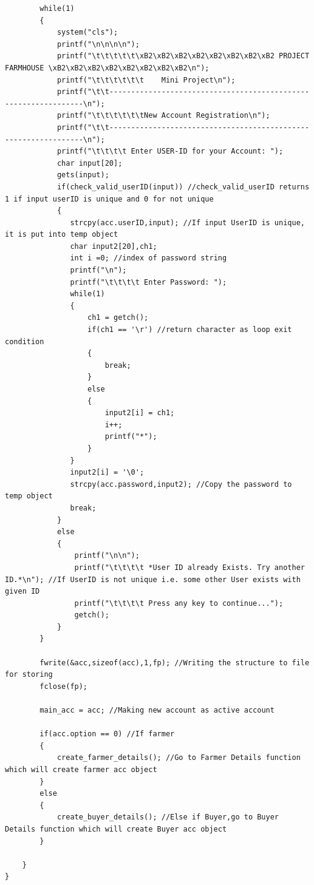 \documentclass[12pt]{article}
\begin{document}
\begin{lstlisting}
        while(1)
        {
            system("cls");
            printf("\n\n\n\n");
            printf("\t\t\t\t\t\xB2\xB2\xB2\xB2\xB2\xB2\xB2\xB2 PROJECT FARMHOUSE \xB2\xB2\xB2\xB2\xB2\xB2\xB2\xB2\n");
            printf("\t\t\t\t\t\t    Mini Project\n");
            printf("\t\t----------------------------------------------------------------\n");
            printf("\t\t\t\t\t\tNew Account Registration\n");
            printf("\t\t----------------------------------------------------------------\n");
            printf("\t\t\t\t Enter USER-ID for your Account: ");
            char input[20];
            gets(input);
            if(check_valid_userID(input)) //check_valid_userID returns 1 if input userID is unique and 0 for not unique
            {
               strcpy(acc.userID,input); //If input UserID is unique, it is put into temp object
               char input2[20],ch1;
               int i =0; //index of password string
               printf("\n");
               printf("\t\t\t\t Enter Password: ");
               while(1)
               {
                   ch1 = getch();
                   if(ch1 == '\r') //return character as loop exit condition
                   {
                       break;
                   }
                   else
                   {
                       input2[i] = ch1;
                       i++;
                       printf("*");
                   }
               }
               input2[i] = '\0';
               strcpy(acc.password,input2); //Copy the password to temp object
               break;
            }
            else
            {
                printf("\n\n");
                printf("\t\t\t\t *User ID already Exists. Try another ID.*\n"); //If UserID is not unique i.e. some other User exists with given ID
                printf("\t\t\t\t Press any key to continue...");
                getch();
            }
        }

        fwrite(&acc,sizeof(acc),1,fp); //Writing the structure to file for storing
        fclose(fp);

        main_acc = acc; //Making new account as active account

        if(acc.option == 0) //If farmer
        {
            create_farmer_details(); //Go to Farmer Details function which will create farmer acc object
        }
        else
        {
            create_buyer_details(); //Else if Buyer,go to Buyer Details function which will create Buyer acc object
        }

    }
}



\end{lstlisting}
\end{document}
